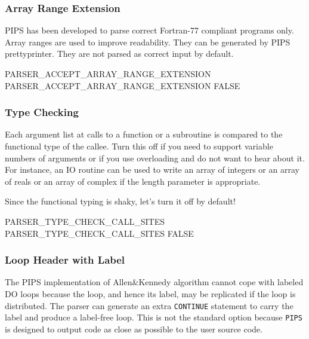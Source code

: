\documentclass[a4paper]{report}
\newcommand{\Pips}{\texttt{PIPS}}
\begin{document}
\subsubsection*{Array Range Extension}

PIPS has been developed to parse correct Fortran-77 compliant programs
only. Array ranges are used to improve readability. They can be generated
by PIPS prettyprinter. They are not parsed as correct input by default.

\begin{PipsProp}{PARSER_ACCEPT_ARRAY_RANGE_EXTENSION}
PARSER_ACCEPT_ARRAY_RANGE_EXTENSION FALSE
\end{PipsProp}

\subsubsection*{Type Checking}

Each argument list at calls to a function or a subroutine is compared to
the functional type of the callee. Turn this off if you need to support
variable numbers of arguments or if you use overloading and do not want to
hear about it. For instance, an IO routine can be used to write an array
of integers or an array of reals or an array of complex if the length
parameter is appropriate.

Since the functional typing is shaky, let's turn it off by default!

\begin{PipsProp}{PARSER_TYPE_CHECK_CALL_SITES}
PARSER_TYPE_CHECK_CALL_SITES FALSE
\end{PipsProp}

\subsubsection*{Loop Header with Label}

The PIPS implementation of Allen\&Kennedy algorithm cannot cope with
labeled DO loops because the loop, and hence its label, may be
replicated if the loop is distributed. The parser can generate an extra
\verb/CONTINUE/ statement to carry the label and produce a label-free
loop. This is not the standard option because \Pips{} is designed to
output code as close as possible to the user source code.
\end{document}
